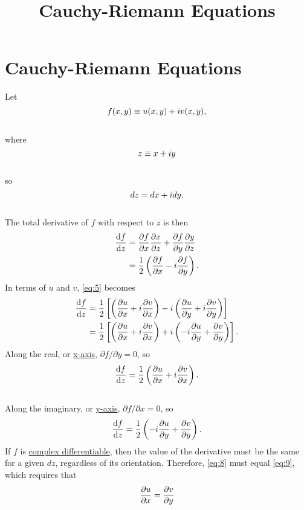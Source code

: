 \documentclass{article}
\title{Cauchy-Riemann Equations}
\begin{document}
\section*{Cauchy-Riemann Equations}
Let
\begin{equation} \label{eq:1}
f(x, y) \equiv u(x, y) + \mathnormal{i} v(x,y),   
\end{equation}\\
where
\begin{equation} \label{eq:2}
z \equiv x+\mathnormal{i}y
\end{equation}\\
so
\begin{equation} \label{eq:3}
dz = dx + \mathnormal{i}dy.
\end{equation}\\
The total derivative of $f$ with respect to $z$ is then
\begin{align}
   \diff{f}z &= \diffp{f}x \diffp{x}z + \diffp{f}y \diffp{y}z \label{eq:4}\\
&= \frac{1}{2}\left(\diffp{f}x-i\diffp{f}y\right). \label{eq:5}
\end{align}
In terms of $u$ and $v$, \eqref{eq:5} becomes
\begin{align}
\diff{f}z &= \frac{1}{2}\left[\left(\diffp{u}x+i\diffp{v}x\right)-i\left(\diffp{u}y+i\diffp{v}y\right)\right] \label{eq:6}\\
&= \frac{1}{2}\left[\left(\diffp{u}x+i\diffp{v}x\right)+i\left(-i\diffp{u}y+\diffp{v}y\right)\right]. \label{eq:7}
\end{align}
Along the real, or \href{https://mathworld.wolfram.com/x-Axis.html}{x-axis}, $\partial f / \partial y = 0$, so
\begin{equation} \label{eq:8}
\diff{f}z = \frac{1}{2}\left(\diffp{u}x + i\diffp{v}x\right).
\end{equation}
\\
Along the imaginary, or \href{https://mathworld.wolfram.com/y-Axis.html}{y-axis}, $\partial f / \partial x = 0$, so
\begin{equation} \label{eq:9}
\diff {f}z = \frac{1}{2}\left(-i\diffp{u}y + \diffp{v}y\right).
\end{equation}
If $f$ is \href{https://mathworld.wolfram.com/ComplexDifferentiable.html}{complex differentiable}, then the value of the derivative must be the same for a given $dz$, regardless of its orientation. Therefore, \eqref{eq:8} must equal \eqref{eq:9}, which requires that
\begin{equation} \label{eq:10}
    \diffp{u}x = \diffp{v}y
\end{equation}
\end{document}
